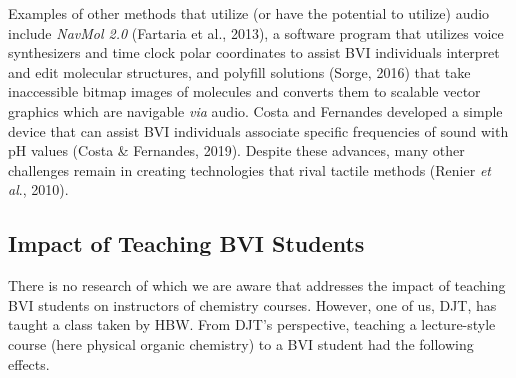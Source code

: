 \documentclass[11.5pt]{sig-alternate} %
\begin{document}
\begin{large}
Examples of other methods that utilize (or have the potential to utilize) audio include \textit{NavMol 2.0} (Fartaria et al., 2013), a software program that utilizes voice synthesizers and time clock polar coordinates to assist BVI individuals interpret and edit molecular structures, and polyfill solutions (Sorge, 2016) that take inaccessible bitmap images of molecules and converts them to scalable vector graphics which are navigable \textit{via} audio. Costa and Fernandes developed a simple device that can assist BVI individuals associate specific frequencies of sound with pH values (Costa \& Fernandes, 2019). Despite these advances, many other challenges remain in creating technologies that rival tactile methods (Renier \textit{et al}., 2010).

\subsection*{Impact of Teaching BVI Students}

There is no research of which we are aware that addresses the impact of teaching BVI students on instructors of chemistry courses. However, one of us, DJT, has taught a class taken by HBW. From DJT’s perspective, teaching a lecture-style course (here physical organic chemistry) to a BVI student had the following effects. 


\end{large}
\end{document}
